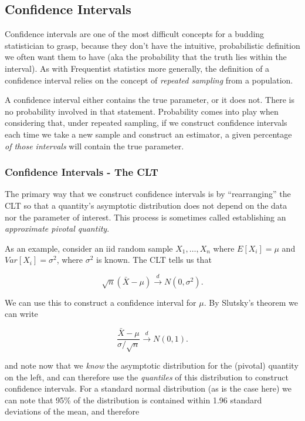 \documentclass[
  letterpaper,
  DIV=11,
  numbers=noendperiod]{scrreprt}
\begin{document}
\subsection*{Confidence Intervals}\label{confidence-intervals}

Confidence intervals are one of the most difficult concepts for a
budding statistician to grasp, because they don't have the intuitive,
probabilistic definition we often want them to have (aka the probability
that the truth lies within the interval). As with Frequentist statistics
more generally, the definition of a confidence interval relies on the
concept of \emph{repeated sampling} from a population.

A confidence interval either contains the true parameter, or it does
not. There is no probability involved in that statement. Probability
comes into play when considering that, under repeated sampling, if we
construct confidence intervals each time we take a new sample and
construct an estimator, a given percentage \emph{of those intervals}
will contain the true parameter.

\subsubsection*{Confidence Intervals - The
CLT}\label{confidence-intervals---the-clt}

The primary way that we construct confidence intervals is by
``rearranging'' the CLT so that a quantity's asymptotic distribution
does not depend on the data nor the parameter of interest. This process
is sometimes called establishing an \emph{approximate pivotal quantity}.

As an example, consider an iid random sample \(X_1, \dots, X_n\) where
\(E[X_i] = \mu\) and \(Var[X_i] = \sigma^2\), where \(\sigma^2\) is
known. The CLT tells us that

\[
\sqrt{n}(\bar{X} - \mu) \overset{d}{\to} N(0, \sigma^2).
\]

We can use this to construct a confidence interval for \(\mu\). By
Slutsky's theorem we can write

\[
\frac{\bar{X} - \mu}{\sigma/\sqrt{n}} \overset{d}{\to} N(0, 1).
\]

and note now that we \emph{know} the asymptotic distribution for the
(pivotal) quantity on the left, and can therefore use the
\emph{quantiles} of this distribution to construct confidence intervals.
For a standard normal distribution (as is the case here) we can note
that 95\% of the distribution is contained within 1.96 standard
deviations of the mean, and therefore
\end{document}
